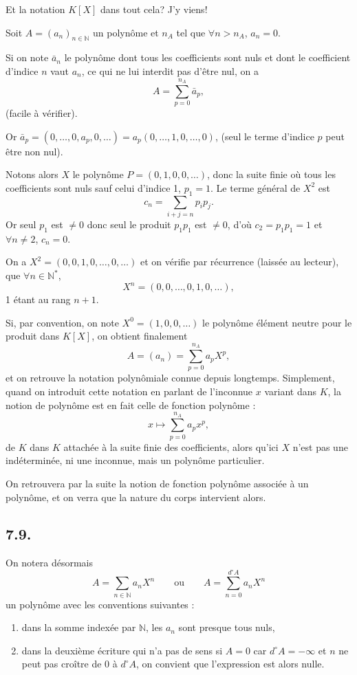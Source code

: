 Et la notation $K[X]$ dans tout cela? J'y viens!

Soit $A=(a_n)_{n\in\mathbb N}$ un polynôme et $n_A$ tel que $\forall n>n_A$, $a_n=0$.

Si on note $\bar a_n$ le polynôme dont tous les coefficients sont nuls et dont le coefficient d'indice $n$ vaut $a_n$, ce qui ne lui interdit pas d'être nul, on a
\[
A=\sum_{p=0}^{n_A}\bar a_p,
\]
(facile à vérifier).

Or $\bar a_p=(0,\ldots,0,a_p,0,\ldots)=a_p(0,\ldots,1,0,\ldots,0)$, (seul le terme d'indice $p$ peut être non nul).

Notons alors $X$ le polynôme $P=(0,1,0,0,\ldots)$, donc la suite finie où tous les coefficients sont nuls sauf celui d'indice 1, $p_1=1$. Le terme général de $X^2$ est
\[
c_n=\sum_{i+j=n}p_ip_j.
\]
Or seul $p_1$ est $\ne0$ donc seul le produit $p_1p_1$ est $\ne0$, d'où $c_2=p_1p_1=1$ et $\forall n\ne2$, $c_n=0$.

On a $X^2=(0,0,1,0,\ldots,0,\ldots)$ et on vérifie par récurrence (laissée au lecteur), que $\forall n\in\mathbb N^*$,
\[
X^n=(0,0,\ldots,0,1,0,\ldots),
\]
1 étant au rang $n+1$.

Si, par convention, on note $X^0=(1,0,0,\ldots)$ le polynôme élément neutre pour le produit dans $K[X]$, on obtient finalement
\[
A=(a_n)=\sum_{p=0}^{n_A}a_pX^p,
\]
et on retrouve la notation polynômiale connue depuis longtemps. Simplement, quand on introduit cette notation en parlant de l'inconnue $x$ variant dans $K$, la notion de polynôme est en fait celle de fonction polynôme :
\[
x\longmapsto\sum_{p=0}^{n_A}a_px^p,
\]
de $K$ dans $K$ attachée à la suite finie des coefficients, alors qu'ici $X$ n'est pas une indéterminée, ni une inconnue, mais un polynôme particulier.

On retrouvera par la suite la notion de fonction polynôme associée à un polynôme, et on verra que la nature du corps intervient alors.

\subsection*{7.9.}

On notera désormais
\[
A=\sum_{n\in\mathbb N}a_nX^n\qquad\text{ou}\qquad A=\sum_{n=0}^{d^\circ A}a_nX^n
\]
un polynôme avec les conventions suivantes :
\begin{enumerate}[label=\arabic*),leftmargin=2.1em]
\item dans la somme indexée par $\mathbb N$, les $a_n$ sont presque tous nuls,
\item dans la deuxième écriture qui n'a pas de sens si $A=0$ car $d^\circ A=-\infty$ et $n$ ne peut pas croître de 0 à $d^\circ A$, on convient que l'expression est alors nulle.
\end{enumerate}

